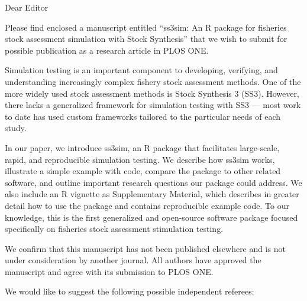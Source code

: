 \documentclass[letterpaper,11pt]{letter}
\begin{document}
\begin{letter}{}
\pagestyle{empty}
\opening{Dear Editor}


Please find enclosed a manuscript entitled ``ss3sim: An R package for fisheries
stock assessment simulation with Stock Synthesis'' that we wish to submit for
possible publication as a research article in PLOS ONE.

Simulation testing is an important component to developing, verifying, and
understanding increasingly complex fishery stock assessment methods. One of the
more widely used stock assessment methods is Stock Synthesis 3 (SS3). However,
there lacks a generalized framework for simulation testing with SS3 --- most
work to date has used custom frameworks tailored to the particular needs of
each study.

In our paper, we introduce ss3sim, an R package that facilitates large-scale,
rapid, and reproducible simulation testing. We describe how ss3sim works,
illustrate a simple example with code, compare the package to other related
software, and outline important research questions our package could address.
We also include an R vignette as Supplementary Material, which describes in
greater detail how to use the package and contains reproducible example code.
To our knowledge, this is the first generalized and open-source software
package focused specifically on fisheries stock assessment stimulation testing.

We confirm that this manuscript has not been published elsewhere and is not
under consideration by another journal. All authors have approved the
manuscript and agree with its submission to PLOS ONE.

We would like to suggest the following possible independent referees:


\end{letter}
\end{document}
